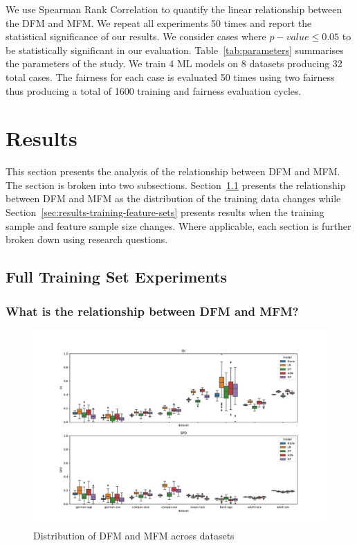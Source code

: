 \documentclass{article}
\begin{document}
We use Spearman Rank Correlation to quantify the linear relationship
between the DFM and MFM. We repeat all experiments 50 times and report
the statistical significance of our results. We consider cases where
$p-value\le0.05$ to be statistically significant in our
evaluation. Table \ref{tab:parameters} summarises the parameters of
the study. We train 4 ML models on 8 datasets producing 32 total
cases. The fairness for each case is evaluated 50 times using two
fairness thus producing a total of 1600 training and fairness
evaluation cycles.

\section{Results}\label{sec:results}

This section presents the analysis of the relationship between DFM and
MFM. The section is broken into two subsections.
Section \ref{sec:results-full} presents the relationship between DFM
and MFM as the distribution of the training data changes while
Section \ref{sec:results-training-feature-sets} presents results when
the training sample and feature sample size changes. Where applicable,
each section is further broken down using research questions.

\subsection{Full Training Set Experiments}\label{sec:results-full}
\subsubsection{What is the relationship between DFM and MFM?}\label{sec:results-full-rel}

\begin{figure}
  \centering
  \includegraphics[width=0.95\linewidth]{boxplot--dataset--di-spd--exp-full.pdf}
  \caption{Distribution of DFM and MFM across datasets}
  \label{fig:boxplot--dataset--di-spd--exp-full}
\end{figure}
\end{document}
